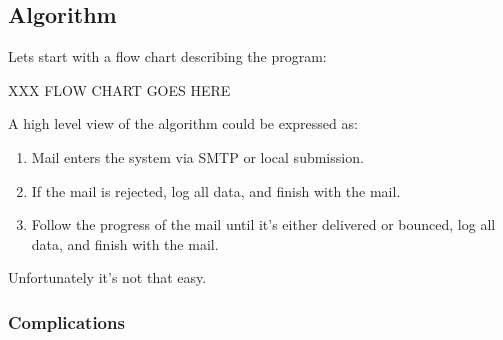 \documentclass[a4paper,12pt,draft]{article}
\begin{document}
\subsection{Algorithm}

Lets start with a flow chart describing the program:

XXX FLOW CHART GOES HERE


A high level view of the algorithm could be expressed as:

\begin{enumerate}

    \item Mail enters the system via SMTP or local submission.
    \item If the mail is rejected, log all data, and finish with the mail.
    \item Follow the progress of the mail until it's either delivered or
        bounced, log all data, and finish with the mail.

\end{enumerate}

Unfortunately it's not that easy.

\subsubsection{Complications}
\end{document}
